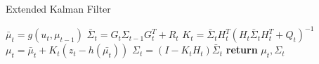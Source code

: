 \begin{center}
\begin{minipage}{.65\linewidth}
\begin{algorithm}[H]
\caption{Extended Kalman Filter}
\label{alg:ekf_def1}
\begin{algorithmic}[1]
  \State $\bar\mu_{t} = g(u_t,\mu_{t-1})$
  \State $\bar\Sigma_{t} = G_{t}\Sigma_{t-1}G_{t}^T + R_{t}$
  \State $K_{t} = \bar\Sigma_{t}H_{t}^T(H_{t}\bar{\Sigma}_{t}H_{t}^T+Q_{t})^{-1}$
  \State $\mu_{t} = \bar\mu_{t} + K_{t}(z_{t} - h(\bar{\mu_t}))$
  \State $\Sigma_{t} = (I - K_{t}H_{t})\bar\Sigma_{t}$
  \State \textbf{return} $\mu_{t}, \Sigma_{t}$
\EndProcedure
\end{algorithmic}
\end{algorithm}
\end{minipage}
\end{center}
